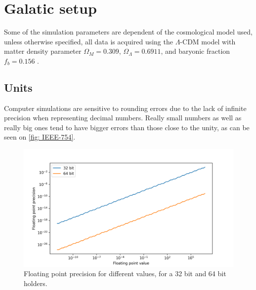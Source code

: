 
%


\newcommand{\keyword}[1]{\textit{#1}}
\newcommand{\sm}[0]{$M_\odot$}
\newcommand{\todo}[1]{\texttt{\color{red}\#TODO: #1}}
\newcommand{\erf}[1]{\text{erf}\left(#1\right)}


\section{Galatic setup}
	Some of the simulation parameters are dependent of the cosmological model used, unless otherwise specified, all data is acquired using the $\Lambda$-CDM model with matter density parameter $\Omega_M = 0.309$, $\Omega_\Lambda = 0.6911$, and baryonic fraction $f_b = 0.156$ \cite{choksi2017recoiling}. 
	
	\subsection{Units}
		Computer simulations are sensitive to rounding errors due to the lack of infinite precision when representing decimal numbers. Really small numbers as well as really big ones tend to have bigger errors than those close to the unity, as can be seen on \autoref{fig: IEEE-754}.
		\begin{figure}[h]
			\centering
			\includegraphics[width=0.8\linewidth]{"../Files/Week 3/floating"}
			\caption{Floating point precision for different values, for a 32 bit and 64 bit holders.}
			\label{fig: IEEE-754}
		\end{figure}
		
